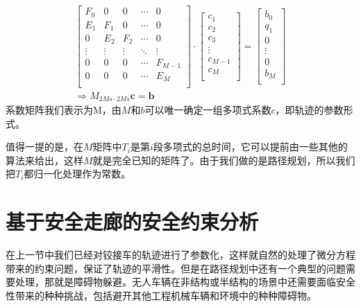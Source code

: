\documentclass[master,academic]{ysuthesis} %
\begin{document}
		\begin{equation}
			\begin{aligned}
				\begin{bmatrix}
					F_0&		0&		0&		\cdots&		0\\
					E_1&		F_1&		0&		\cdots&		0\\
					0&		E_2&		F_2&		\cdots&		0\\
					\vdots&		\vdots&		\vdots&		\ddots&		\vdots\\
					0&		0&		0&		\cdots&		F_{M-1}\\
					0&		0&		0&		\cdots&		E_M\\
				\end{bmatrix} \cdot \begin{bmatrix}
					c_1\\
					c_2\\
					c_3\\
					\vdots\\
					c_{M-1}\\
					c_M\\
				\end{bmatrix} =\begin{bmatrix}
					b_0\\
					q_1\\
					0\\
					\vdots\\
					0\\
					b_M\\
				\end{bmatrix} \\
				\Longrightarrow M_{2Ms\cdot2Ms}\mathbf{c}=\mathbf{b}
			\end{aligned}
			\label{eq:minco参数化}
		\end{equation}
		系数矩阵我们表示为M，由$M$和$b$可以唯一确定一组多项式系数$c$，即轨迹的参数形式。

		值得一提的是，在$M$矩阵中$T_i$是第$i$段多项式的总时间，它可以提前由一些其他的算法来给出，这样$M$就是完全已知的矩阵了。由于我们做的是路径规划，所以我们把$T_i$都归一化处理作为常数。
	
	\section{基于安全走廊的安全约束分析}
	在上一节中我们已经对铰接车的轨迹进行了参数化，这样就自然的处理了微分方程带来的约束问题，保证了轨迹的平滑性。但是在路径规划中还有一个典型的问题需要处理，那就是障碍物躲避。无人车辆在非结构或半结构的场景中还需要面临安全性带来的种种挑战，包括避开其他工程机械车辆和环境中的种种障碍物。
\end{document}
